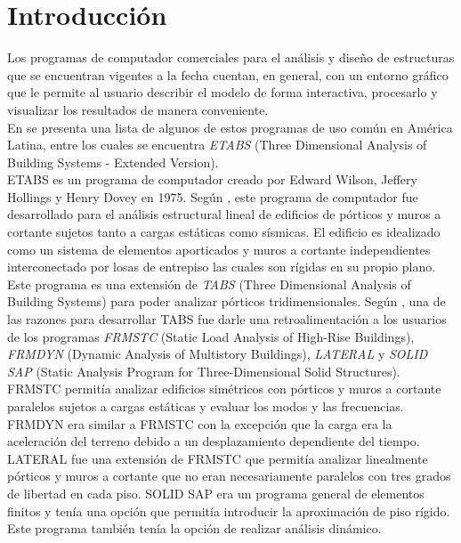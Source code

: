 \chapter{Introducción}
\label{chap:antecedentes}

Los programas de computador comerciales para el análisis y diseño de estructuras que se encuentran vigentes a la fecha cuentan, en general, con un entorno gráfico que le permite al usuario describir el modelo de forma interactiva, procesarlo y visualizar los resultados de manera conveniente.\\

En \cite{escamilla1995microcomputadores} se presenta una lista de algunos de estos programas de uso común en América Latina, entre los cuales se encuentra \emph{ETABS} (Three Dimensional Analysis of Building Systems - Extended Version).\\

ETABS es un programa de computador creado por Edward Wilson, Jeffery Hollings y Henry Dovey en 1975. Según \cite{ETABS1975}, este programa de computador fue desarrollado para el análisis estructural lineal de edificios de pórticos y muros a cortante sujetos tanto a cargas estáticas como sísmicas. El edificio es idealizado como un sistema de elementos aporticados y muros a cortante independientes interconectado por losas de entrepiso las cuales son rígidas en su propio plano.\\

Este programa es una extensión de \emph{TABS} (Three Dimensional Analysis of  Building Systems) para poder analizar pórticos tridimensionales. Según \cite{ETABS1972}, una de las razones para desarrollar TABS fue darle una retroalimentación a los usuarios de los programas \emph{FRMSTC} (Static Load Analysis of High-Rise Buildings), \emph{FRMDYN} (Dynamic Analysis of Multistory Buildings), \emph{LATERAL} y \emph{SOLID SAP} (Static Analysis Program for Three-Dimensional Solid Structures).\\

FRMSTC permitía analizar edificios simétricos con pórticos y muros a cortante paralelos sujetos a cargas estáticas y evaluar los modos y las frecuencias. FRMDYN era similar a FRMSTC con la excepción que la carga era la aceleración del terreno debido a un desplazamiento dependiente del tiempo. LATERAL fue una extensión de FRMSTC que permitía analizar linealmente pórticos y muros a cortante que no eran necesariamente paralelos con tres grados de libertad en cada piso. SOLID SAP era un programa general de elementos finitos y tenía una opción que permitía introducir la aproximación de piso rígido. Este programa también tenía la opción de realizar análisis dinámico.\\

